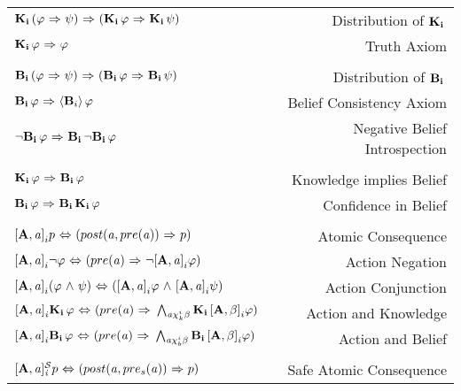 \begin{table}[H]
\begin{center}
\begin{tabular}{| l r |}
	\hline
    $\Kns{i}(\varphi \iimplies \psi) \iimplies (\Kns{i}\varphi \iimplies \Kns{i}\psi)$ & Distribution of $\Kns{i}$ \\
    $\Kns{i}\varphi \iimplies \varphi$ & Truth Axiom \\
    &\\
    $\Bels{i}(\varphi \iimplies \psi) \iimplies (\Bels{i}\varphi \iimplies \Bels{i}\psi)$ & Distribution of $\Bels{i}$\\
    $\Bels{i}\varphi \iimplies \BPoss{i}\varphi$ & Belief Consistency Axiom\\
    $\tlnot\Bels{i}\varphi \iimplies \Bels{i}\tlnot\Bels{i}\varphi$ & Negative Belief Introspection\\
    &\\
    $\Kns{i}\varphi \iimplies \Bels{i}\varphi$ & Knowledge implies Belief \\
    $\Bels{i}\varphi \iimplies \Bels{i}\Kns{i}\varphi$ & Confidence in Belief\\
	&\\
    $\Pal{A,\laa}p \iiff (post(\laa, pre(\laa)) \iimplies p)$ & Atomic Consequence\\
    $\Pal{A,\laa}\tlnot \varphi \iiff (pre(\laa) \iimplies \tlnot \Pal{A,\laa}\varphi)$ & Action Negation\\
    $\Pal{A,\laa}(\varphi \tland \psi) \iiff (\Pal{A,\laa}\varphi \tland \Pal{A,\laa}\psi)$ & Action Conjunction\\
    $\Pal{A,\laa}\Kns{i}\varphi \iiff (pre(\laa)\iimplies \bigwedge_{\laa\chi_{k}^i\beta}\Kns{i}\Pal{A,\beta}\varphi)$ & Action and Knowledge\\
    $\Pal{A,\laa}\Bels{i}\varphi \iiff (pre(\laa)\iimplies \bigwedge_{\laa\chi_{b}^i\beta}\Bels{i}\Pal{A,\beta}\varphi)$ & Action and Belief\\    
    &\\
    $\SPal{A,\laa}p \iiff (post(\laa, pre_s(\laa)) \iimplies p)$ & Safe Atomic Consequence\\

\end{tabular}
\end{center}
\end{table}

